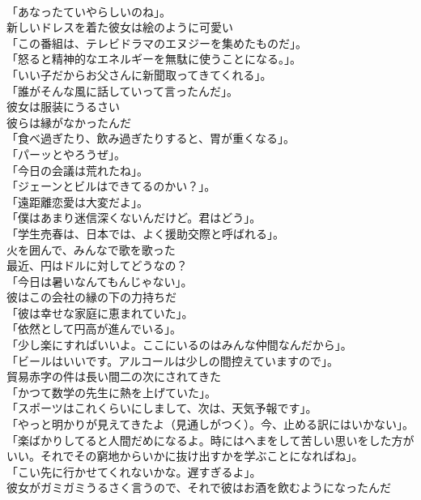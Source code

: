\documentclass[8pt]{extreport}
\begin{document}
\begin{CJK}{UTF8}{min}
\\	「あなったていやらしいのね」。	
\\	新しいドレスを着た彼女は絵のように可愛い	
\\	「この番組は、テレビドラマのエヌジーを集めたものだ」。	
\\	「怒ると精神的なエネルギーを無駄に使うことになる。」。	
\\	「いい子だからお父さんに新聞取ってきてくれる」。	
\\	「誰がそんな風に話していって言ったんだ」。	
\\	彼女は服装にうるさい	
\\	彼らは縁がなかったんだ	
\\	「食べ過ぎたり、飲み過ぎたりすると、胃が重くなる」。	
\\	「パーッとやろうぜ」。	
\\	「今日の会議は荒れたね」。	
\\	「ジェーンとビルはできてるのかい？」。	
\\	「遠距離恋愛は大変だよ」。	
\\	「僕はあまり迷信深くないんだけど。君はどう」。	
\\	「学生売春は、日本では、よく援助交際と呼ばれる」。	
\\	火を囲んで、みんなで歌を歌った	
\\	最近、円はドルに対してどうなの？	
\\	「今日は暑いなんてもんじゃない」。	
\\	彼はこの会社の縁の下の力持ちだ	
\\	「彼は幸せな家庭に恵まれていた」。	
\\	「依然として円高が進んでいる」。	
\\	「少し楽にすればいいよ。ここにいるのはみんな仲間なんだから」。	
\\	「ビールはいいです。アルコールは少しの間控えていますので」。	
\\	貿易赤字の件は長い間二の次にされてきた	
\\	「かつて数学の先生に熱を上げていた」。	
\\	「スポーツはこれくらいにしまして、次は、天気予報です」。	
\\	「やっと明かりが見えてきたよ（見通しがつく）。今、止める訳にはいかない」。	
\\	「楽ばかりしてると人間だめになるよ。時にはへまをして苦しい思いをした方がいい。それでその窮地からいかに抜け出すかを学ぶことになればね」。	
\\	「こい先に行かせてくれないかな。遅すぎるよ」。	
\\	彼女がガミガミうるさく言うので、それで彼はお酒を飲むようになったんだ	

\end{CJK}
\end{document}
